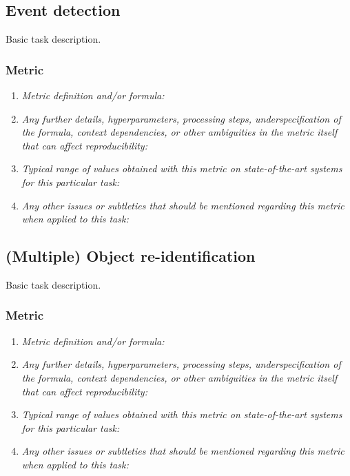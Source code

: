 \documentclass[a4paper,11pt]{article}
\begin{document}
    \subsection{Event detection} \label{event_detection}
        Basic task description.
        \subsubsection{Metric}
            \begin{enumerate}[label=\alph*.]
                \item \textit{Metric definition and/or formula:}
                \bigskip
                \item \textit{Any further details, hyperparameters, processing steps, underspecification of the formula, context dependencies, or other ambiguities in the metric itself that can affect reproducibility:}
                \bigskip
                \item \textit{Typical range of values obtained with this metric on state-of-the-art systems for this particular task:}
                \bigskip
                \item \textit{Any other issues or subtleties that should be mentioned regarding this metric when applied to this task:}
                \bigskip
            \end{enumerate}

    \subsection{(Multiple) Object re-identification}
        Basic task description.
        \subsubsection{Metric}
            \begin{enumerate}[label=\alph*.]
                \item \textit{Metric definition and/or formula:}
                \bigskip
                \item \textit{Any further details, hyperparameters, processing steps, underspecification of the formula, context dependencies, or other ambiguities in the metric itself that can affect reproducibility:}
                \bigskip
                \item \textit{Typical range of values obtained with this metric on state-of-the-art systems for this particular task:}
                \bigskip
                \item \textit{Any other issues or subtleties that should be mentioned regarding this metric when applied to this task:}
                \bigskip
            \end{enumerate}
\end{document}
